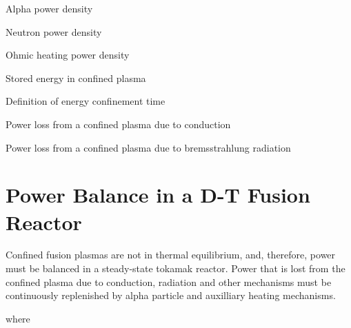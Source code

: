 \noindent
Alpha power density 

\noindent
Neutron power density 

\noindent
Ohmic heating power density 

\noindent
Stored energy in confined plasma 

\noindent
Definition of energy confinement time 

\noindent
Power loss from a confined plasma due to conduction 

\noindent
Power loss from a confined plasma due to bremsstrahlung radiation 


\section{Power Balance in a D-T Fusion Reactor}
Confined fusion plasmas are not in thermal equilibrium, and,
therefore, power must be balanced in a steady-state tokamak reactor.
Power that is lost from the confined plasma due to conduction,
radiation and other mechanisms must be continuously replenished by
alpha particle and auxilliary heating mechanisms.

\noindent
{}
\indent 
where 


